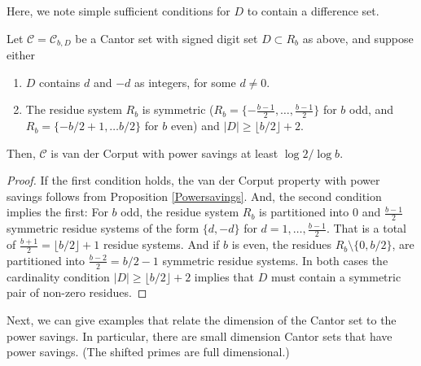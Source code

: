Here, we note simple sufficient conditions for $D$ to contain a difference set. 


\begin{proposition} \label{p:signedSufficient}
  Let $\mathcal C=\mathcal C_{b,D}$ be a Cantor set with signed digit set $D\subset R_b$ as above, and suppose either 
  \begin{enumerate}
      \item $D$ contains $d$ and $-d$ as integers, for some $d\neq 0$. 
      \item The residue system $R_b$ is symmetric ($R_b= \{-\frac {b-1}2,\ldots ,\frac {b-1}2\}$ for $b$ odd, 
      and $R_b=\{-b/2+1,\ldots b/2\}$ for $b$ even) and $\lvert D\rvert \geq  \lfloor b/2\rfloor+2$. 
  \end{enumerate}
Then, $\mathcal C$ is van der Corput with power savings at least $\log 2/\log b$. 

\end{proposition} 

\begin{proof}
 If the first condition holds, the van der Corput property with power savings follows from Proposition \ref{Powersavings}. 
 And, the second condition implies the first: For $b$ odd, the residue system $R_b$ is partitioned into $0$ and $\frac {b-1}2$ 
 symmetric residue systems of the form $\{d,-d\}$ for $d=1,\ldots ,\frac {b-1}2$. That is a total of $\frac{b+1}2= \lfloor b/2\rfloor +1 $ residue systems.  
 And if $b$ is even, the residues $R_b \setminus \{0,b/2\}$, are partitioned into $\frac{b-2}2 = b/2-1$ symmetric residue systems. 
 In both cases the cardinality condition $\lvert D\rvert \geq  \lfloor b/2\rfloor+2$ implies that $D$ must contain a symmetric pair  of non-zero residues. 
   
    
\end{proof}

Next, we can give examples that relate the dimension of the Cantor set to the power savings.  In particular, there are small dimension Cantor sets that have power savings. 
(The shifted primes are full dimensional.) 



